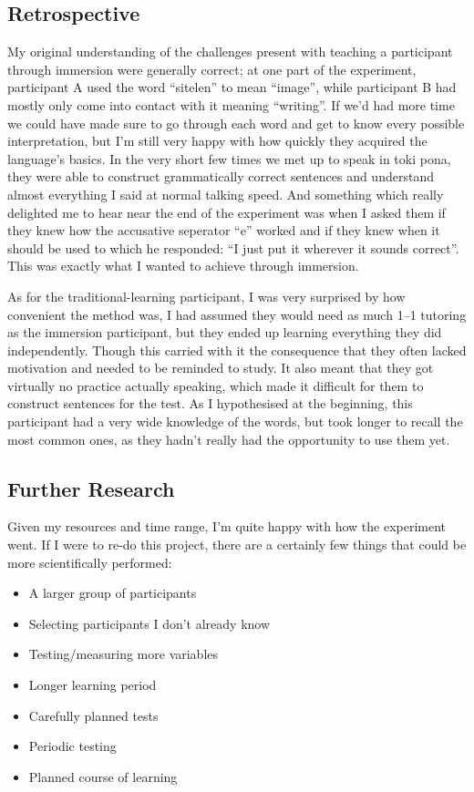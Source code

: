 \documentclass[a4paper,10pt]{article}
\begin{document}
\subsection{Retrospective}
My original understanding of the challenges present with teaching a participant through immersion were
generally correct; at one part of the experiment, participant A used the word ``sitelen'' to mean
``image'', while participant B had mostly only come into contact with it meaning ``writing''. If we'd
had more time we could have made sure to go through each word and get to know every possible
interpretation, but I'm still very happy with how quickly they acquired the language's basics.
In the very short few times we met up to speak in toki pona, they were able to construct grammatically
correct sentences and understand almost everything I said at normal talking speed. And something which
really delighted me to hear near the end of the experiment was when I asked them if they knew how the
accusative seperator ``e'' worked and if they knew when it should be used to which he responded:
``I just put it wherever it sounds correct''. This was exactly what I wanted to achieve through immersion.

As for the traditional-learning participant, I was very surprised by how convenient the method was,
I had assumed they would need as much 1--1 tutoring as the immersion participant, but they ended up
learning everything they did independently. Though this carried with it the consequence that they
often lacked motivation and needed to be reminded to study. It also meant that they got virtually no
practice actually speaking, which made it difficult for them to construct sentences for the test. As I
hypothesised at the beginning, this participant had a very wide knowledge of the words, but took longer
to recall the most common ones, as they hadn't really had the opportunity to use them yet.

\subsection{Further Research}
Given my resources and time range, I'm quite happy with how the experiment went. If I were to re-do
this project, there are a certainly few things that could be more scientifically performed:

\begin{itemize}
	\item A larger group of participants
	\item Selecting participants I don't already know
	\item Testing/measuring more variables
	\item Longer learning period
	\item Carefully planned tests
	\item Periodic testing
	\item Planned course of learning
\end{itemize}
\end{document}
